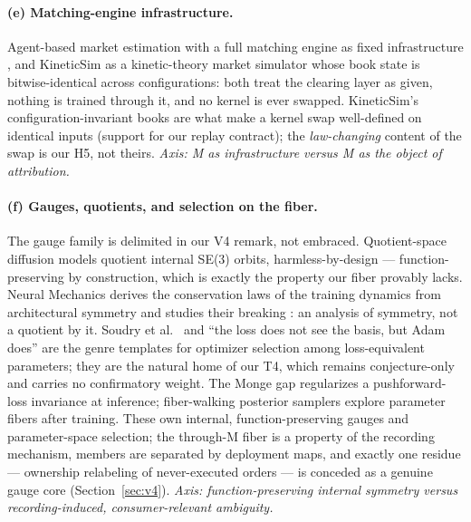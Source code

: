 \paragraph{(e) Matching-engine infrastructure.}
Agent-based market estimation with a full matching engine as fixed
infrastructure \citep{matchingengineabm2021}, and KineticSim
\citep{kineticsim2026} as a kinetic-theory market simulator whose book state
is bitwise-identical across configurations: both treat the clearing layer as
given, nothing is trained through it, and no kernel is ever swapped.
KineticSim's configuration-invariant books are what make a kernel swap
well-defined on identical inputs (support for our replay contract); the
\emph{law-changing} content of the swap is our H5, not theirs.
\emph{Axis: M as infrastructure versus M as the object of attribution.}

\paragraph{(f) Gauges, quotients, and selection on the fiber.}
The gauge family is delimited in our V4 remark, not embraced.
Quotient-space diffusion models quotient internal SE(3) orbits,
harmless-by-design \citep{quotientdiffusion2026} --- function-preserving by
construction, which is exactly the property our fiber provably lacks.
Neural Mechanics derives the conservation laws of the training dynamics
from architectural symmetry and studies their breaking
\citep{neuralmechanics2020}: an analysis of symmetry, not a quotient by it. Soudry et al.\ \citep{soudry2017} and ``the loss does
not see the basis, but Adam does'' \citep{lossbasis2026} are the genre
templates for optimizer selection among loss-equivalent parameters; they are
the natural home of our T4, which remains conjecture-only and carries no
confirmatory weight. The Monge gap \citep{mongegap2023} regularizes a
pushforward-loss invariance at inference; fiber-walking posterior samplers
\citep{walkingfiber2025} explore parameter fibers after training. These own
internal, function-preserving gauges and parameter-space selection; the
through-M fiber is a property of the recording mechanism, members are
separated by deployment maps, and exactly one residue --- ownership
relabeling of never-executed orders --- is conceded as a genuine gauge core
(Section~\ref{sec:v4}). \emph{Axis: function-preserving internal symmetry
versus recording-induced, consumer-relevant ambiguity.}

